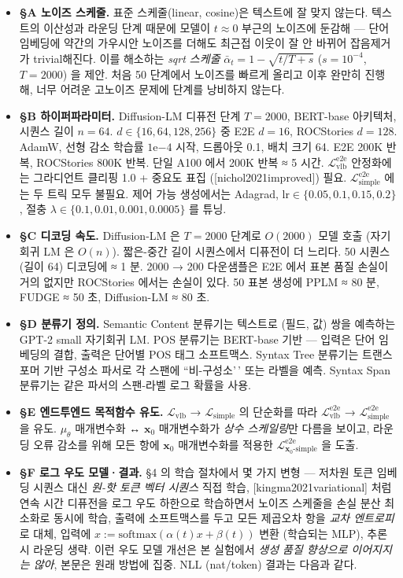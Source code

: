 \documentclass[
]{article}
\providecommand{\tightlist}{%
  \setlength{\itemsep}{0pt}\setlength{\parskip}{0pt}}
\begin{document}
\begin{itemize}
\tightlist
\item
  \textbf{§A 노이즈 스케줄.} 표준 스케줄(linear, cosine)은 텍스트에 잘
  맞지 않는다. 텍스트의 이산성과 라운딩 단계 때문에 모델이
  \(t \approx 0\) 부근의 노이즈에 둔감해 --- 단어 임베딩에 약간의
  가우시안 노이즈를 더해도 최근접 이웃이 잘 안 바뀌어 잡음제거가
  trivial해진다. 이를 해소하는 \emph{sqrt 스케줄}
  \(\bar\alpha_t = 1 - \sqrt{t/T + s}\) (\(s = 10^{-4}\), \(T = 2000\))
  을 제안. 처음 50 단계에서 노이즈를 빠르게 올리고 이후 완만히 진행해,
  너무 어려운 고노이즈 문제에 단계를 낭비하지 않는다.
\item
  \textbf{§B 하이퍼파라미터.} Diffusion-LM 디퓨전 단계 \(T=2000\),
  BERT-base 아키텍처, 시퀀스 길이 \(n=64\).
  \(d \in \{16, 64, 128, 256\}\) 중 E2E \(d=16\), ROCStories \(d=128\).
  AdamW, 선형 감소 학습률 \(1\text{e}{-4}\) 시작, 드롭아웃 0.1, 배치
  크기 64. E2E 200K 반복, ROCStories 800K 반복. 단일 A100 에서 200K 반복
  ≈ 5 시간. \(\mathcal{L}^\text{e2e}_\text{vlb}\) 안정화에는 그라디언트
  클리핑 1.0 + 중요도 표집 ({[}nichol2021improved{]}) 필요.
  \(\mathcal{L}^\text{e2e}_\text{simple}\) 에는 두 트릭 모두 불필요.
  제어 가능 생성에서는 Adagrad,
  \(\mathrm{lr} \in \{0.05, 0.1, 0.15, 0.2\}\), 절충
  \(\lambda \in \{0.1, 0.01, 0.001, 0.0005\}\) 를 튜닝.
\item
  \textbf{§C 디코딩 속도.} Diffusion-LM 은 \(T=2000\) 단계로 \(O(2000)\)
  모델 호출 (자기회귀 LM 은 \(O(n)\)). 짧은-중간 길이 시퀀스에서
  디퓨전이 더 느리다. 50 시퀀스(길이 64) 디코딩에 ≈ 1 분. 2000 → 200
  다운샘플은 E2E 에서 표본 품질 손실이 거의 없지만 ROCStories 에서는
  손실이 있다. 50 표본 생성에 PPLM ≈ 80 분, FUDGE ≈ 50 초, Diffusion-LM
  ≈ 80 초.
\item
  \textbf{§D 분류기 정의.} Semantic Content 분류기는 텍스트로 (필드, 값)
  쌍을 예측하는 GPT-2 small 자기회귀 LM. POS 분류기는 BERT-base 기반 ---
  입력은 단어 임베딩의 결합, 출력은 단어별 POS 태그 소프트맥스. Syntax
  Tree 분류기는 트랜스포머 기반 구성소 파서로 각 스팬에 ``비-구성소'\,'
  또는 라벨을 예측. Syntax Span 분류기는 같은 파서의 스팬-라벨 로그
  확률을 사용.
\item
  \textbf{§E 엔드투엔드 목적함수 유도.} \(\mathcal{L}_\text{vlb}\) →
  \(\mathcal{L}_\text{simple}\) 의 단순화를 따라
  \(\mathcal{L}^\text{e2e}_\text{vlb}\) →
  \(\mathcal{L}^\text{e2e}_\text{simple}\) 을 유도. \(\mu_\theta\)
  매개변수화 ↔ \(\mathbf{x}_0\) 매개변수화가 \emph{상수 스케일링}만
  다름을 보이고, 라운딩 오류 감소를 위해 모든 항에 \(\mathbf{x}_0\)
  매개변수화를 적용한
  \(\mathcal{L}^\text{e2e}_{\mathbf{x}_0\text{-simple}}\) 을 도출.
\item
  \textbf{§F 로그 우도 모델·결과.} §4 의 학습 절차에서 몇 가지 변형 ---
  저차원 토큰 임베딩 시퀀스 대신 \emph{원-핫 토큰 벡터 시퀀스} 직접
  학습, {[}kingma2021variational{]} 처럼 연속 시간 디퓨전을 로그 우도
  하한으로 학습하면서 노이즈 스케줄을 손실 분산 최소화로 동시에 학습,
  출력에 소프트맥스를 두고 모든 제곱오차 항을 \emph{교차 엔트로피}로
  대체, 입력에 \(x := \mathrm{softmax}(\alpha(t) x + \beta(t))\) 변환
  (학습되는 MLP), 추론 시 라운딩 생략. 이런 우도 모델 개선은 본 실험에서
  \emph{생성 품질 향상으로 이어지지는 않아}, 본문은 원래 방법에 집중.
  NLL (nat/token) 결과는 다음과 같다.
\end{itemize}
\end{document}
